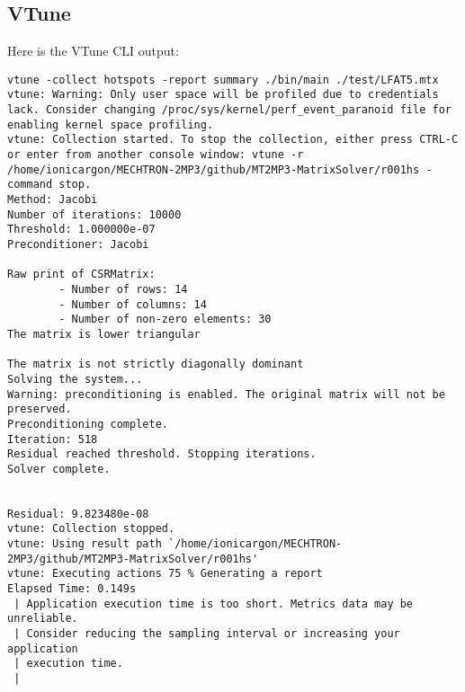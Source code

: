 \documentclass[12pt]{article}
\begin{document}
    \subsection{VTune}
    Here is the VTune CLI output:
    \begin{verbatim}
vtune -collect hotspots -report summary ./bin/main ./test/LFAT5.mtx
vtune: Warning: Only user space will be profiled due to credentials lack. Consider changing /proc/sys/kernel/perf_event_paranoid file for enabling kernel space profiling.
vtune: Collection started. To stop the collection, either press CTRL-C or enter from another console window: vtune -r /home/ionicargon/MECHTRON-2MP3/github/MT2MP3-MatrixSolver/r001hs -command stop.
Method: Jacobi
Number of iterations: 10000
Threshold: 1.000000e-07
Preconditioner: Jacobi

Raw print of CSRMatrix:
        - Number of rows: 14
        - Number of columns: 14
        - Number of non-zero elements: 30
The matrix is lower triangular

The matrix is not strictly diagonally dominant
Solving the system...
Warning: preconditioning is enabled. The original matrix will not be preserved.
Preconditioning complete.
Iteration: 518
Residual reached threshold. Stopping iterations.
Solver complete.


Residual: 9.823480e-08
vtune: Collection stopped.
vtune: Using result path `/home/ionicargon/MECHTRON-2MP3/github/MT2MP3-MatrixSolver/r001hs'
vtune: Executing actions 75 % Generating a report                              Elapsed Time: 0.149s
 | Application execution time is too short. Metrics data may be unreliable.
 | Consider reducing the sampling interval or increasing your application
 | execution time.
 |


\end{verbatim}
\end{document}

